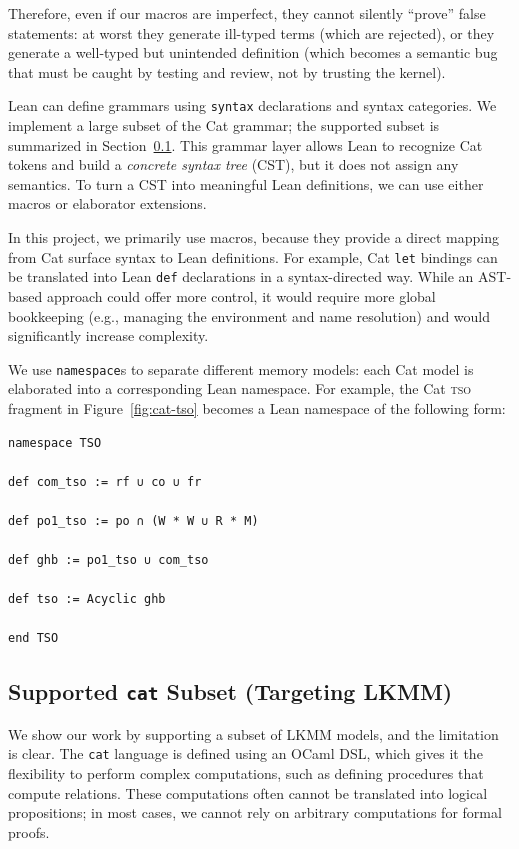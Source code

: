 Therefore, even if our macros are imperfect, they cannot silently ``prove'' false statements: at worst they generate ill-typed terms (which are rejected), or they generate a well-typed but unintended definition (which becomes a semantic bug that must be caught by testing and review, not by trusting the kernel).

Lean can define grammars using \texttt{syntax} declarations and syntax categories. We implement a large subset of the Cat grammar; the supported subset is summarized in Section~\ref{sec:design:cat-subset}. This grammar layer allows Lean to recognize Cat tokens and build a \emph{concrete syntax tree} (CST), but it does not assign any semantics. To turn a CST into meaningful Lean definitions, we can use either macros or elaborator extensions.

In this project, we primarily use macros, because they provide a direct mapping from Cat surface syntax to Lean definitions. For example, Cat \texttt{let} bindings can be translated into Lean \texttt{def} declarations in a syntax-directed way. While an AST-based approach could offer more control, it would require more global bookkeeping (e.g., managing the environment and name resolution) and would significantly increase complexity.

We use \texttt{namespace}s to separate different memory models: each Cat model is elaborated into a corresponding Lean namespace. For example, the Cat \textsc{tso} fragment in Figure~\ref{fig:cat-tso} becomes a Lean namespace of the following form:
\begin{verbatim}
namespace TSO

def com_tso := rf ∪ co ∪ fr

def po1_tso := po ∩ (W * W ∪ R * M)

def ghb := po1_tso ∪ com_tso

def tso := Acyclic ghb

end TSO
\end{verbatim}

\subsection{Supported \texttt{cat} Subset (Targeting LKMM)}
\label{sec:design:cat-subset}
We show our work by supporting a subset of LKMM models, and the limitation is clear. The \texttt{cat} language is defined using an OCaml DSL, which gives it the flexibility to perform complex computations, such as defining procedures that compute relations. These computations often cannot be translated into logical propositions; in most cases, we cannot rely on arbitrary computations for formal proofs.

